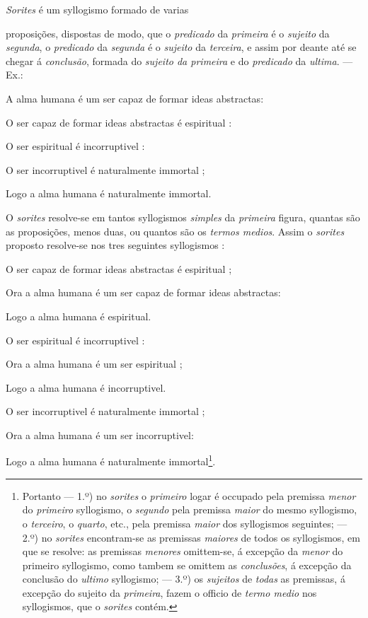
 
\emph{Sorites} é um syllogismo formado de varias

proposições, dispostas de modo, que o \emph{predicado} da \emph{primeira} é o \emph{sujeito} da \emph{segunda}, o \emph{predicado} da \emph{segunda} é o \emph{sujeito} da \emph{terceira}, e assim por deante até se chegar á \emph{conclusão}, formada do \emph{sujeito da primeira} e do \emph{predicado} da \emph{ultima}. --- Ex.:

A alma humana é um ser capaz de formar ideas abstractas:

O ser capaz de formar ideas abstractas é espiritual :

O ser espiritual é incorruptivel :

O ser incorruptivel é naturalmente immortal ;

Logo a alma humana é naturalmente immortal.

O \emph{sorites} resolve-se em tantos syllogismos \emph{simples} da \emph{primeira} figura, quantas são as proposições, menos duas, ou quantos são os \emph{termos medios}. Assim o \emph{sorites} proposto resolve-se nos tres seguintes syllogismos :

O ser capaz de formar ideas abstractas é espiritual ;

Ora a alma humana é um ser capaz de formar ideas abstractas:

Logo a alma humana é espiritual.

O ser espiritual é incorruptivel :

Ora a alma humana é um ser espiritual ;

Logo a alma humana é incorruptivel.

O ser incorruptivel é naturalmente immortal ;

Ora a alma humana é um ser incorruptivel:

Logo a alma humana é naturalmente immortal\footnote{Portanto --- 1.º) no \emph{sorites} o \emph{primeiro} logar é occupado pela premissa \emph{menor} do \emph{primeiro} syllogismo, o \emph{segundo} pela premissa \emph{maior} do mesmo syllogismo, o \emph{terceiro}, o \emph{quarto}, etc., pela premissa \emph{maior} dos syllogismos seguintes; --- 2.º) no \emph{sorites} encontram-se as premissas \emph{maiores} de todos os syllogismos, em que se resolve: as premissas \emph{menores} omittem-se, á excepção da \emph{menor} do primeiro syllogismo, como tambem se omittem as \emph{conclusões}, á excepção da conclusão do \emph{ultimo} syllogismo; --- 3.º) os \emph{sujeitos} de \emph{todas} as premissas, á excepção do sujeito da \emph{primeira}, fazem o officio de \emph{termo medio} nos syllogismos, que o \emph{sorites} contém.}.

